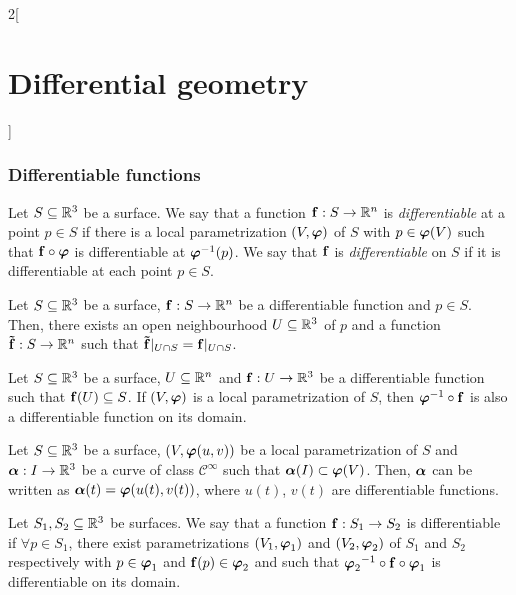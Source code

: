 \documentclass[../../../main.tex]{subfiles}
\begin{document}
\begin{multicols}{2}[\section{Differential geometry}]
  \subsubsection{Differentiable functions}
  \begin{definition}
    Let $S\subseteq\mathbb{R}^3$ be a surface. We say that a function $\boldsymbol{\mathrm{f}}:S\rightarrow \mathbb{R}^n$ is \emph{differentiable} at a point $p\in S$ if there is a local parametrization $(V,\boldsymbol{\mathrm{\varphi}})$ of $S$ with $p\in\boldsymbol{\mathrm{\varphi}}(V)$ such that $\boldsymbol{\mathrm{f}}\circ\boldsymbol{\mathrm{\varphi}}$ is differentiable at ${\boldsymbol{\mathrm{\varphi}}}^{-1}(p)$. We say that $\boldsymbol{\mathrm{f}}$ is \emph{differentiable} on $S$ if it is differentiable at each point $p\in S$.
  \end{definition}
  \begin{proposition}
    Let $S\subseteq\mathbb{R}^3$ be a surface, $\boldsymbol{\mathrm{f}}:S\rightarrow \mathbb{R}^n$ be a differentiable function and $p\in S$. Then, there exists an open neighbourhood $U\subseteq\mathbb{R}^3$ of $p$ and a function $\boldsymbol{\mathrm{\tilde{f}}}:S\rightarrow \mathbb{R}^n$ such that $\boldsymbol{\mathrm{\tilde{f}}}|_{U\cap S}=\boldsymbol{\mathrm{f}}|_{U\cap S}$.
  \end{proposition}
  \begin{corollary}
    Let $S\subseteq\mathbb{R}^3$ be a surface, $U\subseteq \mathbb{R}^n$ and $\boldsymbol{\mathrm{f}}:U\rightarrow \mathbb{R}^3$ be a differentiable function such that $\boldsymbol{\mathrm{f}}(U)\subseteq S$. If $(V,\boldsymbol{\mathrm{\varphi}})$ is a local parametrization of $S$, then ${\boldsymbol{\mathrm{\varphi}}}^{-1}\circ\boldsymbol{\mathrm{f}}$ is also a differentiable function on its domain.
  \end{corollary}
  \begin{corollary}
    Let $S\subseteq\mathbb{R}^3$ be a surface, $(V,\boldsymbol{\mathrm{\varphi}}(u,v))$ be a local parametrization of $S$ and $\boldsymbol{\mathrm{\alpha}}:I\rightarrow\mathbb{R}^3$ be a curve of class $\mathcal{C}^\infty$ such that $\boldsymbol{\mathrm{\alpha}}(I)\subset \boldsymbol{\mathrm{\varphi}}(V)$. Then, $\boldsymbol{\mathrm{\alpha}}$ can be written as $\boldsymbol{\mathrm{\alpha}}(t)=\boldsymbol{\mathrm{\varphi}}(u(t),v(t))$, where $u(t)$, $v(t)$ are differentiable functions.
  \end{corollary}
  \begin{definition}
    Let $S_1,S_2\subseteq\mathbb{R}^3$ be surfaces. We say that a function $\boldsymbol{\mathrm{f}}:S_1\rightarrow S_2$ is differentiable if $\forall p\in S_1$, there exist parametrizations $(V_1,\boldsymbol{\mathrm{\varphi}}_1)$ and $(V_2,\boldsymbol{\mathrm{\varphi}}_2)$ of $S_1$ and $S_2$ respectively with $p\in\boldsymbol{\mathrm{\varphi}}_1$ and $\boldsymbol{\mathrm{f}}(p)\in\boldsymbol{\mathrm{\varphi}}_2$ and such that ${\boldsymbol{\mathrm{\varphi}}_2}^{-1}\circ\boldsymbol{\mathrm{f}}\circ\boldsymbol{\mathrm{\varphi}}_1$ is differentiable on its domain.
  \end{definition}

\end{multicols}
\end{document}
